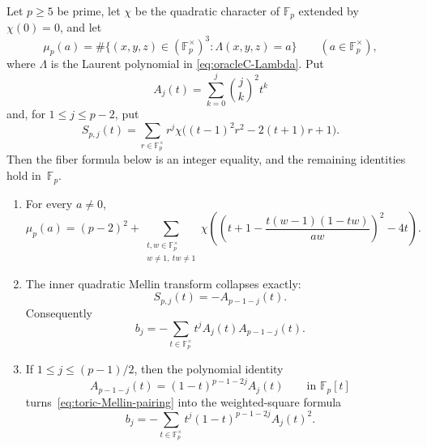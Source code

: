 \begin{proposition}
\label{prop:toric-mellin-square}
Let $p\geq5$ be prime, let $\chi$ be the quadratic character of
$\mathbb F_p$ extended by $\chi(0)=0$, and let
\[
 \mu_p(a)=\#\{(x,y,z)\in(\mathbb F_p^\times)^3:
                   \Lambda(x,y,z)=a\}
 \qquad(a\in\mathbb F_p^\times),
\]
where $\Lambda$ is the Laurent polynomial in
\eqref{eq:oracleC-Lambda}.  Put
\[
 A_j(t)=\sum_{k=0}^j\binom jk^2t^k
\]
and, for $1\leq j\leq p-2$, put
\[
 S_{p,j}(t)=\sum_{r\in\mathbb F_p^\times}r^j
 \chi\bigl((t-1)^2r^2-2(t+1)r+1\bigr).
\]
Then the fiber formula below is an integer equality, and the remaining
identities hold in~$\mathbb F_p$.

\begin{enumerate}
\item For every $a\ne0$,
  \begin{equation}
   \mu_p(a)=(p-2)^2+
   \sum_{\substack{t,w\in\mathbb F_p^\times\\
                    w\ne1,\ tw\ne1}}
   \chi\!\left(
    \left(t+1-\frac{t(w-1)(1-tw)}{aw}\right)^2-4t
   \right).
   \label{eq:toric-fiber-quadratic}
  \end{equation}

\item The inner quadratic Mellin transform collapses exactly:
  \begin{equation}
   \boxed{S_{p,j}(t)=-A_{p-1-j}(t).}
   \label{eq:toric-inner-collapse}
  \end{equation}
  Consequently
  \begin{equation}
   \boxed{
   b_j=-\sum_{t\in\mathbb F_p^\times}
       t^jA_j(t)A_{p-1-j}(t).}
   \label{eq:toric-Mellin-pairing}
  \end{equation}

\item If $1\leq j\leq(p-1)/2$, then the polynomial identity
  \begin{equation}
   A_{p-1-j}(t)=(1-t)^{p-1-2j}A_j(t)
   \qquad\text{in }\mathbb F_p[t]
   \label{eq:toric-Legendre-duality}
  \end{equation}
  turns~\eqref{eq:toric-Mellin-pairing} into the weighted-square formula
  \begin{equation}
   \boxed{
   b_j=-\sum_{t\in\mathbb F_p^\times}
       t^j(1-t)^{p-1-2j}A_j(t)^2.}
   \label{eq:toric-weighted-square}
  \end{equation}
\end{enumerate}
\end{proposition}

